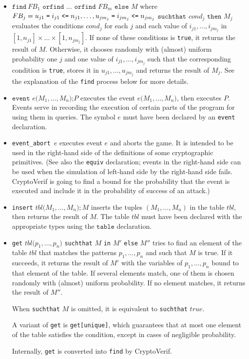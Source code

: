 \begin{itemize}
\item 
$\texttt{find}\ FB_1 \texttt{ orfind }\ldots\texttt{ orfind }FB_m \texttt{ else } M$ where $FB_j = u_{j1} \mathrel{\texttt{=}}  i_{j1} \mathrel{\texttt{<=}}  n_{j1}, \ldots, u_{jm_j} \mathrel{\texttt{=}}  i_{jm_j} \mathrel{\texttt{<=}}  n_{jm_j}$ $\texttt{suchthat}$ $cond_j$ $\texttt{then}$ $M_j$
evaluates the conditions
$cond_j$ for each $j$ and
each value of $i_{j1}, \ldots, i_{jm_j}$ in $[1, n_{j1}] 
\times \ldots \times [1, n_{jm_j}]$.
If none of these conditions is \texttt{true}, it returns the result of $M$.
Otherwise, it chooses randomly with (almost) uniform probability
one $j$ and one value of $i_{j1}, \ldots, i_{jm_j}$
such that the corresponding condition is \texttt{true},
stores it in $u_{j1}, \ldots, u_{jm_j}$ and returns 
the result of $M_j$.
See the explanation of the {\tt find} process below for more details.

\item $\texttt{event }e\texttt{(}M_1, \ldots, M_n\texttt{);}P$ executes the
event $e\texttt{(}M_1, \ldots, M_n\texttt{)}$, then executes $P$.
Events serve in recording the execution of certain parts of the program
for using them in queries. The symbol $e$ must have been declared
by an \texttt{event} declaration.

\item \texttt{event\string_abort $e$} executes event $e$ and aborts the game.
It is intended to be used in the right-hand side
of the definitions of some cryptographic primitives. (See also
the \texttt{equiv} declaration; events in the right-hand side can be
used when the simulation of left-hand side by the right-hand side
fails. CryptoVerif is going to find a bound for the probability that the event is
executed and include it in the probability of success of an attack.)

\item \texttt{insert} $\mathit{tbl}\texttt{(}M_1, \ldots, M_n\texttt{)}; M$
inserts the tuples $(M_1, \ldots, M_n)$ in the table $\mathit{tbl}$, 
then returns the result of $M$.
The table $\mathit{tbl}$ must have been declared with the appropriate
types using the $\texttt{table}$ declaration.

\item \texttt{get} $\mathit{tbl}\texttt{(}p_1, \ldots, p_n\texttt{)}$ \texttt{suchthat} $M$ \texttt{in} $M'$ \texttt{else} $M''$ tries to find an element of the table $\mathit{tbl}$ that matches the patterns $p_1, \ldots, p_n$ and such that $M$ is true. If it succeeds, it returns the result of $M'$ with the variables of $p_1, \ldots, p_n$ bound to that element of the table. If several elements match, one of them is chosen randomly with (almost) uniform probability. If no element matches, it returns the result of $M''$. 

When \texttt{suchthat} $M$ is omitted, it is equivalent to \texttt{suchthat} $\mathit{true}$. 

A variant of {\tt get} is {\tt get[unique]}, which guarantees that at most one element of the table satisfies the condition, except in cases of negligible probability.

Internally, \texttt{get} is converted into \texttt{find} by CryptoVerif.

\end{itemize}

